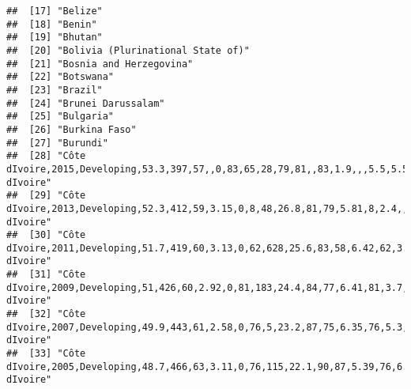 \documentclass[
]{article}
\begin{document}
\begin{verbatim}
##  [17] "Belize"                                                                                                                                               
##  [18] "Benin"                                                                                                                                                
##  [19] "Bhutan"                                                                                                                                               
##  [20] "Bolivia (Plurinational State of)"                                                                                                                     
##  [21] "Bosnia and Herzegovina"                                                                                                                               
##  [22] "Botswana"                                                                                                                                             
##  [23] "Brazil"                                                                                                                                               
##  [24] "Brunei Darussalam"                                                                                                                                    
##  [25] "Bulgaria"                                                                                                                                             
##  [26] "Burkina Faso"                                                                                                                                         
##  [27] "Burundi"                                                                                                                                              
##  [28] "Côte dIvoire,2015,Developing,53.3,397,57,,0,83,65,28,79,81,,83,1.9,,,5.5,5.5,,\nCôte dIvoire"                                                         
##  [29] "Côte dIvoire,2013,Developing,52.3,412,59,3.15,0,8,48,26.8,81,79,5.81,8,2.4,,,5.8,5.7,,\nCôte dIvoire"                                                 
##  [30] "Côte dIvoire,2011,Developing,51.7,419,60,3.13,0,62,628,25.6,83,58,6.42,62,3.3,,,6.1,6,,\nCôte dIvoire"                                                
##  [31] "Côte dIvoire,2009,Developing,51,426,60,2.92,0,81,183,24.4,84,77,6.41,81,3.7,,,6.5,6.4,,\nCôte dIvoire"                                                
##  [32] "Côte dIvoire,2007,Developing,49.9,443,61,2.58,0,76,5,23.2,87,75,6.35,76,5.3,,,6.8,6.7,,\nCôte dIvoire"                                                
##  [33] "Côte dIvoire,2005,Developing,48.7,466,63,3.11,0,76,115,22.1,90,87,5.39,76,6.1,,,7.2,7.1,,\nCôte dIvoire"                                              

\end{verbatim}
\end{document}
